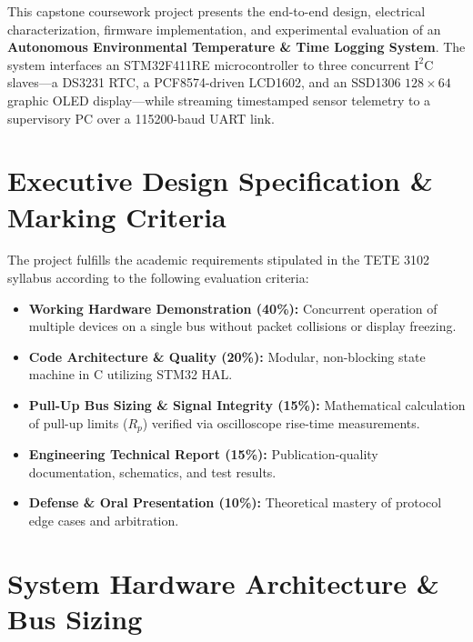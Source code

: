 \documentclass[11pt,a4paper]{article}
\begin{document}

\begin{objectivebox}
This capstone coursework project presents the end-to-end design, electrical characterization, firmware implementation, and experimental evaluation of an \textbf{Autonomous Environmental Temperature \& Time Logging System}. The system interfaces an STM32F411RE microcontroller to three concurrent $\text{I}^2\text{C}$ slaves—a DS3231 RTC, a PCF8574-driven LCD1602, and an SSD1306 $128\times 64$ graphic OLED display—while streaming timestamped sensor telemetry to a supervisory PC over a 115200-baud UART link.
\end{objectivebox}

\section{Executive Design Specification \& Marking Criteria}
The project fulfills the academic requirements stipulated in the TETE 3102 syllabus according to the following evaluation criteria:
\begin{itemize}
    \item \textbf{Working Hardware Demonstration (40\%):} Concurrent operation of multiple devices on a single bus without packet collisions or display freezing.
    \item \textbf{Code Architecture \& Quality (20\%):} Modular, non-blocking state machine in C utilizing STM32 HAL.
    \item \textbf{Pull-Up Bus Sizing \& Signal Integrity (15\%):} Mathematical calculation of pull-up limits ($R_p$) verified via oscilloscope rise-time measurements.
    \item \textbf{Engineering Technical Report (15\%):} Publication-quality documentation, schematics, and test results.
    \item \textbf{Defense \& Oral Presentation (10\%):} Theoretical mastery of protocol edge cases and arbitration.
\end{itemize}

\section{System Hardware Architecture \& Bus Sizing}
\end{document}
